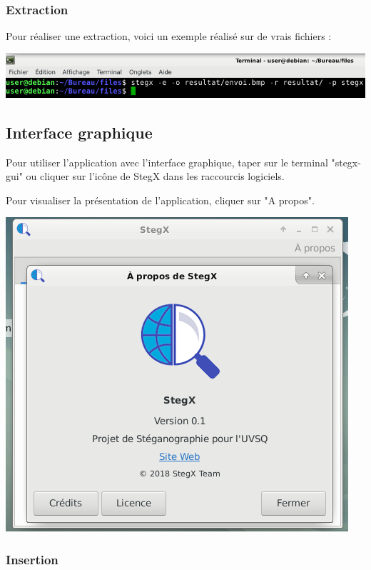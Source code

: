 \documentclass[11pt]{article}
\begin{document}
\subsubsection{Extraction}

Pour réaliser une extraction, voici un exemple réalisé sur de vrais 
fichiers :

\vspace{0.5cm}
\includegraphics[scale=0.8]{pictures/extraction.png}

\subsection{Interface graphique}

Pour utiliser l'application avec l'interface graphique, taper sur le 
terminal "stegx-gui" ou cliquer sur l'icône de StegX dans les raccourcis 
logiciels. 

Pour visualiser la présentation de l'application, cliquer sur "A propos". 

\vspace{0.5cm}
\hspace{2cm}
\includegraphics[scale=0.8]{pictures/a_propos.png}
\vspace{1cm}

\subsubsection{Insertion}
\end{document}
